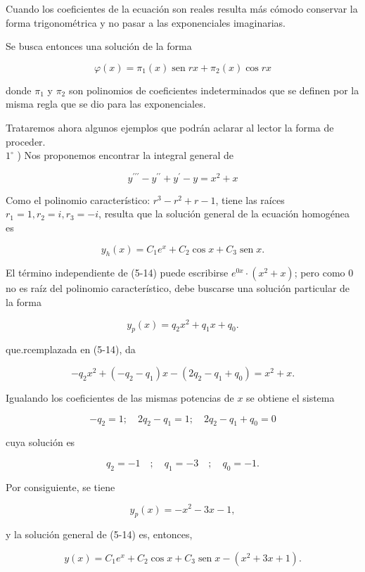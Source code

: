 \documentclass[10pt]{article}
\theoremstyle{plain}
\theoremstyle{definition}
\theoremstyle{remark}
\begin{document}
Cuando los coeficientes de la ecuación son reales resulta más cómodo conservar la forma trigonométrica y no pasar a las exponenciales imaginarias.

Se busca entonces una solución de la forma

$$
\varphi(x)=\pi_{1}(x) \operatorname{sen} r x+\pi_{2}(x) \cos r x
$$

donde $\pi_{1}$ y $\pi_{2}$ son polinomios de coeficientes indeterminados que se definen por la misma regla que se dio para las exponenciales.

Trataremos ahora algunos ejemplos que podrán aclarar al lector la forma de proceder.\\
$1^{\circ}$ ) Nos proponemos encontrar la integral general de


\begin{equation*}
y^{\prime \prime \prime}-y^{\prime \prime}+y^{\prime}-y=x^{2}+x \tag{5-14}
\end{equation*}


Como el polinomio característico: $r^{3}-r^{2}+r-1$, tiene las raíces $r_{1}=1, r_{2}=i, r_{3}=-i$, resulta que la solución general de la ecuación homogénea es

$$
y_{h}(x)=C_{1} e^{x}+C_{2} \cos x+C_{3} \operatorname{sen} x .
$$

El término independiente de (5-14) puede escribirse $e^{0 x} \cdot\left(x^{2}+x\right)$; pero como 0 no es raíz del polinomio característico, debe buscarse una solución particular de la forma

$$
y_{p}(x)=q_{2} x^{2}+q_{1} x+q_{0} .
$$

que.rcemplazada en (5-14), da

$$
-q_{2} x^{2}+\left(-q_{2}-q_{1}\right) x-\left(2 q_{2}-q_{1}+q_{0}\right)=x^{2}+x .
$$

Igualando los coeficientes de las mismas potencias de $x$ se obtiene el sistema

$$
-q_{2}=1 ; \quad 2 q_{2}-q_{1}=1 ; \quad 2 q_{2}-q_{1}+q_{0}=0
$$

cuya solución es

$$
q_{2}=-1 \quad ; \quad q_{1}=-3 \quad ; \quad q_{0}=-1 .
$$

Por consiguiente, se tiene

$$
y_{p}(x)=-x^{2}-3 x-1,
$$

y la solución general de (5-14) es, entonces,

$$
y(x)=C_{1} e^{x}+C_{2} \cos x+C_{3} \operatorname{sen} x-\left(x^{2}+3 x+1\right) .
$$
\end{document}

